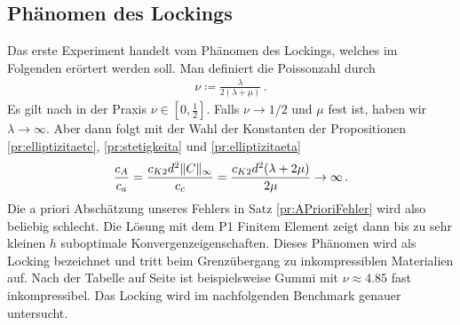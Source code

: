 \documentclass{scrartcl}
\DeclarePairedDelimiter{\norm}{\lVert}{\rVert}
\begin{document}
\subsection{Phänomen des Lockings}

Das erste Experiment handelt vom Phänomen des Lockings, welches im Folgenden erörtert werden soll.
Man definiert die Poissonzahl durch 
\begin{align*}
	\nu \coloneqq \frac{\lambda}{2(\lambda+\mu)}\,.	
\end{align*}
Es gilt nach \cite[S.14]{Lif-1959} in der Praxis $\nu\in[0,\frac{1}{2}]$.
Falls $\nu\to 1/2$ und $\mu$ fest ist, haben wir $\lambda\to\infty$. Aber dann folgt mit der Wahl der Konstanten der Propositionen \ref{pr:elliptizitaetc}, \ref{pr:stetigkeita} und \ref{pr:elliptizitaeta}
\begin{align*}
	\frac{c_A}{c_a}=\frac{c_{K2}d^2\norm{C}_\infty}{c_c}=\frac{c_{K2}d^2(\lambda+2\mu)}{2\mu}\to\infty\,.
\end{align*}
Die a priori Abschätzung unseres Fehlers in Satz \ref{pr:APrioriFehler} wird also beliebig schlecht. Die Lösung mit dem P1 Finitem Element zeigt dann bis zu sehr kleinen $h$ suboptimale Konvergenzeigenschaften. Dieses Phänomen wird als Locking bezeichnet
und tritt beim Grenzübergang zu inkompressiblen Materialien auf. Nach der Tabelle auf Seite \pageref{ta:durchschnittlicheParameter} ist beispielsweise Gummi mit $\nu\approx4.85$ fast inkompressibel.
Das Locking wird im nachfolgenden Benchmark genauer untersucht.
\end{document}
